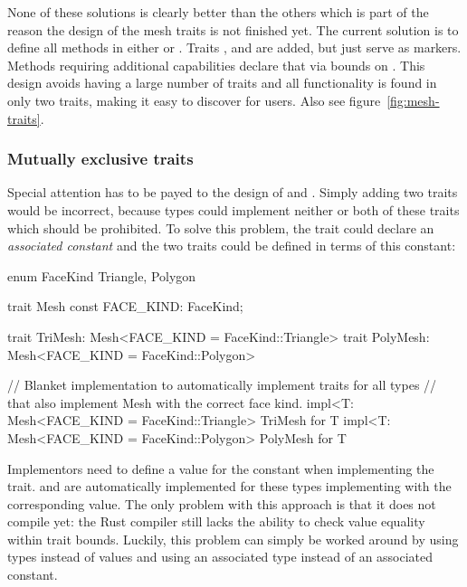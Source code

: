 None of these solutions is clearly better than the others which is part of the reason the design of the mesh traits is not finished yet.
The current solution is to define all methods in either  or .
Traits ,  and  are added, but just serve as markers.
Methods requiring additional capabilities declare that via bounds on .
This design avoids having a large number of traits and all functionality is found in only two traits, making it easy to discover for users.
Also see figure~\ref{fig:mesh-traits}.

\subsubsection*{Mutually exclusive traits}

Special attention has to be payed to the design of  and .
Simply adding two traits would be incorrect, because types could implement neither or both of these traits which should be prohibited.
To solve this problem, the trait  could declare an \emph{associated constant} and the two traits could be defined in terms of this constant:

\begin{rustcode}
  enum FaceKind { Triangle, Polygon }

  trait Mesh {
      const FACE_KIND: FaceKind;
  }

  trait TriMesh: Mesh<FACE_KIND = FaceKind::Triangle> {}
  trait PolyMesh: Mesh<FACE_KIND = FaceKind::Polygon> {}

  // Blanket implementation to automatically implement traits for all types
  // that also implement Mesh with the correct face kind.
  impl<T: Mesh<FACE_KIND = FaceKind::Triangle> TriMesh for T {}
  impl<T: Mesh<FACE_KIND = FaceKind::Polygon> PolyMesh for T {}
\end{rustcode}

Implementors need to define a value for the constant when implementing the trait.
 and  are automatically implemented for these types implementing  with the corresponding value.
The only problem with this approach is that it does not compile yet:
the Rust compiler still lacks the ability to check value equality within trait bounds.
Luckily, this problem can simply be worked around by using types instead of values and using an associated type instead of an associated constant.

